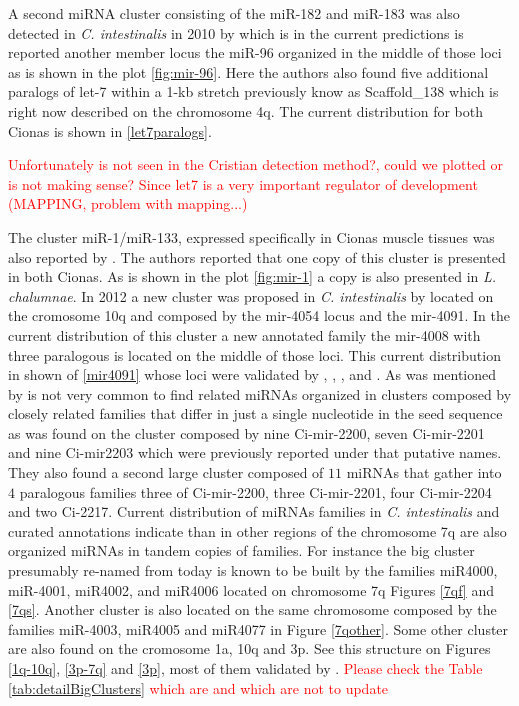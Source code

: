 \documentclass[graybox]{svmult}
\begin{document}
A second miRNA cluster consisting of the miR-182 and miR-183 was also detected 
in \textit{C. intestinalis} in 2010 by \cite{Keshavan2010} which is in the 
current predictions is reported another member locus the miR-96 organized in the 
middle of those loci as is shown in the plot \ref{fig:mir-96}. Here the 
authors also found five additional paralogs of let-7 within a 1-kb stretch 
previously know as Scaffold\_138 which is right now described on the chromosome 
4q. The current distribution for both Cionas is shown in \ref{let7paralogs}. 

\textcolor{red}{Unfortunately is not seen in the Cristian detection method?, 
could we plotted or is not making sense? Since let7 is a very important 
regulator of development (MAPPING, problem with mapping...)}

The cluster miR-1/miR-133, expressed specifically in Cionas muscle tissues was 
also reported by \cite{Kusakabe2013}. The authors reported that one copy of this 
cluster is presented in both Cionas. As is shown in the plot 
\ref{fig:mir-1} a copy is also presented in \textit{L. chalumnae}. In 2012 a 
new cluster was proposed in \textit{C. intestinalis} by \cite{Terai2012} located 
on the cromosome 10q and composed by the mir-4054 locus and the mir-4091. In 
the current distribution of this cluster a new annotated family the mir-4008 
with three paralogous is located on the middle of those loci. This current 
distribution in shown of \ref{mir4091} whose loci were  validated 
by \cite{Norden-Krichmar2007}, \cite{Fu2008}, \cite{Hendrix2010}, and 
\cite{Terai2012}. As was mentioned by \cite{Hendrix2010} is not very common to 
find related miRNAs organized in clusters composed by closely related families 
that differ in just a single nucleotide in the seed sequence as was found on the 
cluster composed by nine Ci-mir-2200, seven Ci-mir-2201 and nine Ci-mir2203 
which were previously reported under that putative names. They also found a 
second large cluster composed of $11$ miRNAs that gather into $4$ paralogous 
families three of Ci-mir-2200, three Ci-mir-2201, four Ci-mir-2204 and two 
Ci-2217. Current distribution of miRNAs families in \textit{C. intestinalis} and 
curated annotations indicate than in other regions of the chromosome 7q are also 
organized miRNAs in tandem copies of families. For instance the big cluster 
presumably re-named from \cite{Hendrix2010} today is known to be built by the 
families miR4000, miR-4001, miR4002, and miR4006 located on chromosome 7q 
Figures \ref{7qf} and \ref{7qs}. Another cluster is also located on the same 
chromosome composed by the families miR-4003, miR4005 and miR4077 in Figure 
\ref{7qother}. Some other cluster are also found on the cromosome 1a, 10q and 
3p. See this structure on Figures \ref{1q-10q}, \ref{3p-7q} and \ref{3p}, most 
of them validated by \cite{Hendrix2010}. \textcolor{red}{Please check the Table 
\ref{tab:detailBigClusters} which are and which are not to update}
\end{document}
